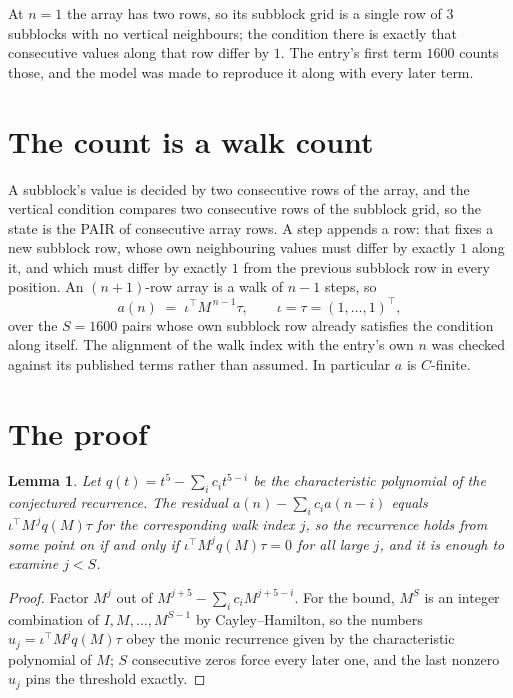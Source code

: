 \documentclass[11pt,a4paper]{article}
\theoremstyle{plain}
\newtheorem{lemma}[theorem]{Lemma}
\theoremstyle{definition}
\begin{document}
At $n=1$ the array has two rows, so its subblock grid is a single row of $3$ subblocks with
no vertical neighbours; the condition there is exactly that consecutive values along that row
differ by $1$. The entry's first term $1600$ counts those, and the model was made to
reproduce it along with every later term.

\section{The count is a walk count}

A subblock's value is decided by two consecutive rows of the array, and the
vertical condition compares two consecutive rows of the subblock grid, so the state is the
PAIR of consecutive array rows. A step appends a row: that fixes a new subblock row, whose own
neighbouring values must differ by exactly $1$ along it, and which must differ by exactly
$1$ from the previous subblock row in every position. An $(n+1)$-row array is a walk of
$n-1$ steps, so
\[
a(n)\;=\;\iota^{\!\top}M^{\,n-1}\tau,\qquad\iota=\tau=(1,\dots,1)^{\!\top},
\]
over the $S=1600$ pairs whose own subblock row already satisfies the condition along itself.
The alignment of the walk index with the entry's own $n$ was checked against its published
terms rather than assumed. In particular $a$ is $C$-finite.

\section{The proof}

\begin{lemma}\label{lem:crit}
Let $q(t)=t^{5}-\sum_i c_it^{5-i}$ be the characteristic polynomial of the
conjectured recurrence. The residual $a(n)-\sum_ic_ia(n-i)$ equals
$\iota^{\!\top}M^{\,j}q(M)\tau$ for the corresponding walk index $j$, so the recurrence
holds from some point on if and only if $\iota^{\!\top}M^{j}q(M)\tau=0$ for all large $j$,
and it is enough to examine $j<S$.
\end{lemma}

\begin{proof}
Factor $M^{j}$ out of $M^{j+5}-\sum_ic_iM^{j+5-i}$. For the bound, $M^{S}$
is an integer combination of $I,M,\dots,M^{S-1}$ by Cayley--Hamilton, so the numbers
$u_j=\iota^{\!\top}M^{j}q(M)\tau$ obey the monic recurrence given by the characteristic
polynomial of $M$; $S$ consecutive zeros force every later one, and the last nonzero $u_j$
pins the threshold exactly.
\end{proof}
\end{document}
